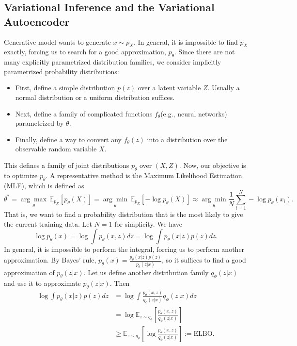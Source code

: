 \subsection{Variational Inference and the Variational Autoencoder}
Generative model wants to generate $x\sim p_X$. In general, it is impossible to find $p_X$ exactly, forcing us to search for a good approximation, $p_{\theta}$. Since there are not many explicitly parametrized distribution families, we consider implicitly parametrized probability distributions:
\begin{itemize}
    \item First, define a simple distribution $p(z)$ over a latent variable $Z$. Usually a normal distribution or a uniform distribution suffices.
    \item Next, define a family of complicated functions $f_{\theta}$(e.g., neural networks) parametrized by $\theta$.
    \item Finally, define a way to convert any $f_{\theta}(z)$ into a distribution over the observable random variable $X$.
\end{itemize}
This defines a family of joint distributions $p_{\theta}$ over $(X,Z)$.
Now, our objective is to optimize $p_{\theta}$. A representative method is the Maximum Likelihood Estimation (MLE), which is defined as
\[\theta^*=\underset{\theta}{\arg\max}\,\mathbb{E}_{ p_X}\left[p_{\theta}(X)\right]=\underset{\theta}{\arg\min}\,\mathbb{E}_{ p_X}\left[-\log p_{\theta}(X)\right]\approx\underset{\theta}{\arg\min}\frac{1}{N}\sum_{i=1}^N-\log p_{\theta}(x_i).\] That is, we want to find a probability distribution that is the most likely to give the current training data. Let $N=1$ for simplicity. 
We have 
\[
\log p_{\theta}(x) = \log\int p_{\theta}(x,z)dz= \log\int p_{\theta}(x|z)p(z)dz.
\]
In general, it is impossible to perform the integral, forcing us to perform another approximation. By Bayes' rule, $p_{\theta}(x)=\frac{p_{\theta}(x|z)p(z)}{p_{\theta}(z|x)}$, so it suffices to find a good approximation of $p_{\theta}(z|x)$. Let us define another distribution family $q_{\phi}(z|x)$ and use it to approximate $p_{\theta}(z|x)$. Then
\[\begin{aligned}
    \log\int p_{\theta}(x|z)p(z)dz &=\log \int \frac{p_{\theta}(x,z)}{q_{\phi}(z|x)}q_{\phi}(z|x)dz\\&=\log\mathbb{E}_{z\sim q_{\phi}}\left[\frac{p_{\theta}(x,z)}{q_{\phi}(z|x)}\right]\\&\geq \mathbb{E}_{z\sim q_{\phi}}\left[\log\frac{p_{\theta}(x,z)}{q_{\phi}(z|x)}\right]:=\text{ELBO}.
\end{aligned}\]
